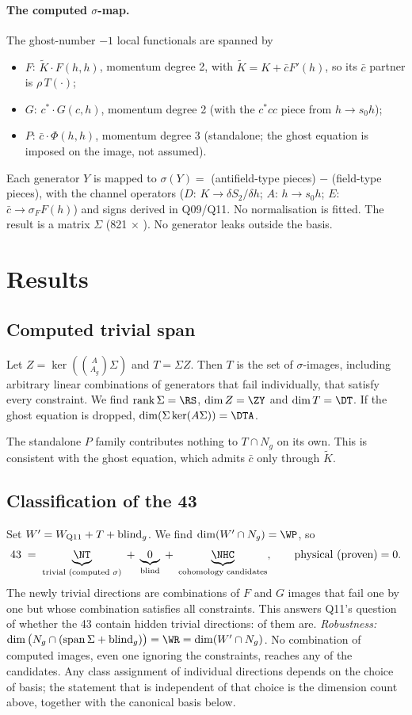 \documentclass[11pt]{article}
\begin{document}
\paragraph{The computed $\sigma$-map.} The ghost-number $-1$ local functionals are spanned by
\begin{itemize}
\item $F$: $\tilde K\cdot F(h,h)$, momentum degree 2, with $\tilde K=K+\bar c F'(h)$, so its $\bar c$ partner is $\rho\,T(\cdot)$;
\item $G$: $c^*\cdot G(c,h)$, momentum degree 2 (with the $c^*cc$ piece from $h\to s_0h$);
\item $P$: $\bar c\cdot\Phi(h,h)$, momentum degree 3 (standalone; the ghost equation is imposed on the image, not assumed).
\end{itemize}
Each generator $Y$ is mapped to $\sigma(Y)=$ (antifield-type pieces) $-$ (field-type pieces), with the channel operators
($D$: $K\to\delta S_2/\delta h$; $A$: $h\to s_0h$; $E$: $\bar c\to\sigma_F F(h)$) and signs derived in Q09/Q11. No
normalisation is fitted. The result is a matrix $\Sigma$ (821 $\times$ \NY). No generator leaks outside the basis.

\section{Results}
\subsection{Computed trivial span}
Let $Z=\ker(\binom{A}{A_g}\Sigma)$ and $T=\Sigma Z$. Then $T$ is the set of $\sigma$-images, including arbitrary linear
combinations of generators that fail individually, that satisfy every constraint. We find
$\operatorname{rank}\Sigma=\RS$, $\dim Z=\ZY$ and $\dim T=\DT$. If the ghost equation is dropped, $\dim(\Sigma\ker(A\Sigma))=\DTA$.

The standalone $P$ family contributes nothing to $T\cap N_g$ on its own. This is consistent with the ghost equation, which
admits $\bar c$ only through $\tilde K$.

\subsection{Classification of the 43}
Set $W'=W_{\rm Q11}+T+\text{blind}_g$. We find $\dim(W'\cap N_g)=\WP$, so
\[ 43 \;=\; \underbrace{\NT}_{\text{trivial (computed }\sigma)} \;+\; \underbrace{0}_{\text{blind}} \;+\;
\underbrace{\NHC}_{\text{cohomology candidates}},\qquad \text{physical (proven)}=0 . \]
The \NT{} newly trivial directions are combinations of $F$ and $G$ images that fail one by one but whose combination
satisfies all constraints. This answers Q11's question of whether the 43 contain hidden trivial directions: \NT{} of them are.
\emph{Robustness:} $\dim\big(N_g\cap(\operatorname{span}\Sigma+\text{blind}_g)\big)=\WR=\dim(W'\cap N_g)$. No
combination of computed images, even one ignoring the constraints, reaches any of the \NHC{} candidates. Any class
assignment of individual directions depends on the choice of basis; the statement that is independent of that choice is the
dimension count above, together with the canonical basis below.
\end{document}
